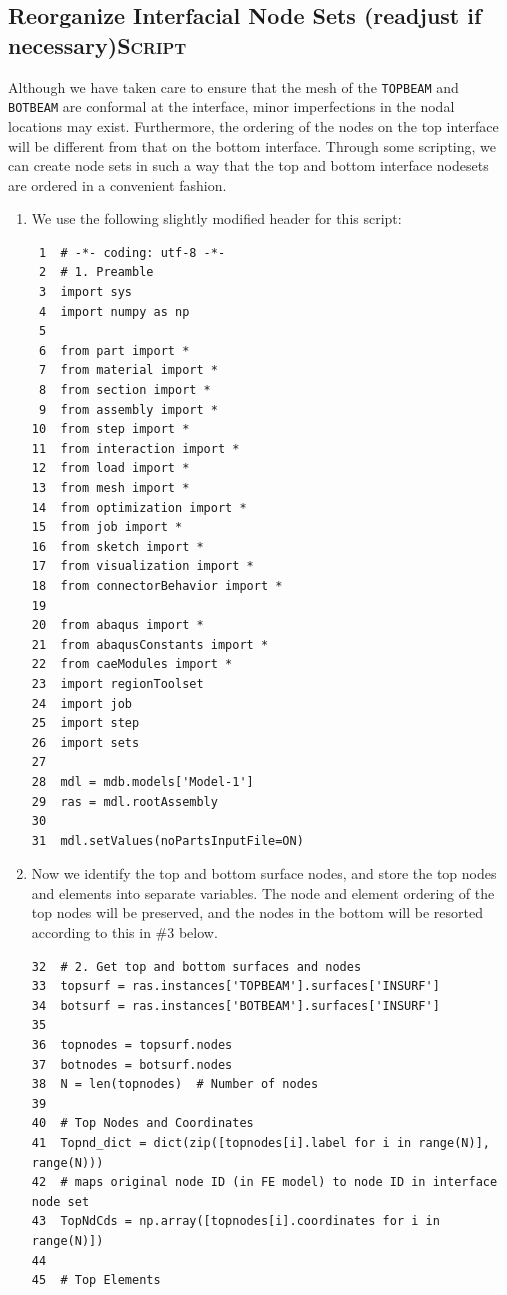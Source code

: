 \documentclass[11pt]{article}
\begin{document}
\subsection{Reorganize Interfacial Node Sets (readjust if necessary)\hfill{}\textsc{Script}}
\label{sec:org5560124}
Although we have taken care to ensure that the mesh of the \texttt{TOPBEAM} and \texttt{BOTBEAM} are conformal at the interface, minor imperfections in the nodal locations may exist.
Furthermore, the ordering of the nodes on the top interface will be different from that on the bottom interface.
Through some scripting, we can create node sets in such a way that the top and bottom interface nodesets are ordered in a convenient fashion.
\begin{enumerate}
\item We use the following slightly modified header for this script:
\begin{verbatim}
 1  # -*- coding: utf-8 -*-
 2  # 1. Preamble
 3  import sys
 4  import numpy as np
 5  
 6  from part import *
 7  from material import *
 8  from section import *
 9  from assembly import *
10  from step import *
11  from interaction import *
12  from load import *
13  from mesh import *
14  from optimization import *
15  from job import *
16  from sketch import *
17  from visualization import *
18  from connectorBehavior import *
19  
20  from abaqus import *
21  from abaqusConstants import *
22  from caeModules import * 
23  import regionToolset
24  import job
25  import step
26  import sets
27  
28  mdl = mdb.models['Model-1']
29  ras = mdl.rootAssembly
30  
31  mdl.setValues(noPartsInputFile=ON)
\end{verbatim}
\item Now we identify the top and bottom surface nodes, and store the top nodes and elements into separate variables.
The node and element ordering of the top nodes will be preserved, and the nodes in the bottom will be resorted according to this in \#3 below.
\begin{verbatim}
32  # 2. Get top and bottom surfaces and nodes
33  topsurf = ras.instances['TOPBEAM'].surfaces['INSURF']
34  botsurf = ras.instances['BOTBEAM'].surfaces['INSURF']
35  
36  topnodes = topsurf.nodes
37  botnodes = botsurf.nodes
38  N = len(topnodes)  # Number of nodes
39  
40  # Top Nodes and Coordinates
41  Topnd_dict = dict(zip([topnodes[i].label for i in range(N)], range(N)))
42  # maps original node ID (in FE model) to node ID in interface node set
43  TopNdCds = np.array([topnodes[i].coordinates for i in range(N)])
44  
45  # Top Elements

\end{verbatim}
\end{enumerate}
\end{document}
